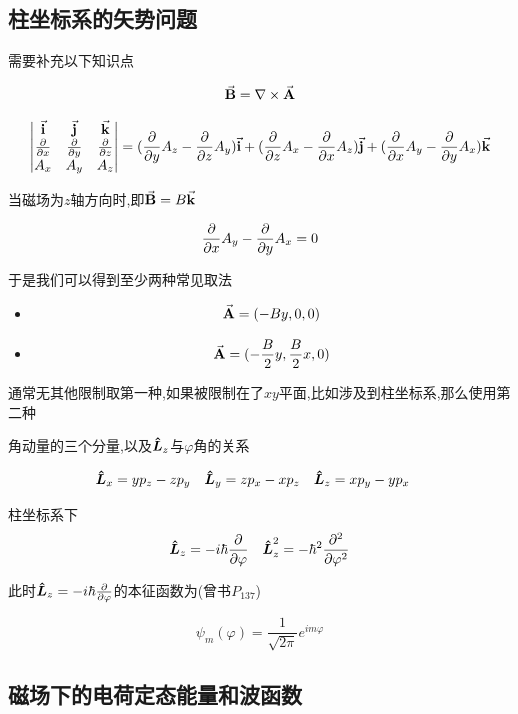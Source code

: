 \documentclass{article}
\begin{document}
        \subsection{柱坐标系的矢势问题}
            \begin{formal}
                需要补充以下知识点

                $$ \va{B} = \nabla \times \va{A} $$

                $$ 
                \mqty|\va{i} & \va{j} & \va{k} \\ \pdv{x} & \pdv{y} & \pdv{z} \\ A_{x} & A_{y} & A_{z}|  = 
                (\pdv{y}A_{z} - \pdv{z}A_{y}) \va{i} + (\pdv{z}A_{x} - \pdv{x}A_{z}) \va{j} + (\pdv{x}A_{y} - \pdv{y}A_{x})\va{k} 
                $$

                当磁场为$z$轴方向时,即$\va{B} = B \va{k}$

                $$ \pdv{x}A_{y} - \pdv{y}A_{x} = 0 $$

                于是我们可以得到至少两种常见取法
                \begin{itemize}
                    \item $$ \va{A} = (-By,0,0) $$
                    \item $$ \va{A} = (-\frac{B}{2}y,\frac{B}{2}x,0) $$
                \end{itemize}

                通常无其他限制取第一种,如果被限制在了$xy$平面,比如涉及到柱坐标系,那么使用第二种

                角动量的三个分量,以及$\vu*{L}_{z}$与$\varphi$角的关系

                $$ \vu*{L}_{x} = y p_{z} - z p_{y} \quad \vu*{L}_{y} = z p_{x} - x p_{z} \quad \vu*{L}_{z} = x p_{y} - y p_{x} \quad $$

                柱坐标系下
                $$ \vu*{L}_{z} = -i\hbar \pdv{\varphi} \quad \vu*{L}_{z}^{2} = -\hbar^{2} \pdv[2]{\varphi} $$

                此时$\vu*{L}_{z} = -i\hbar \pdv{\varphi}$的本征函数为(曾书$P_{137}$)

                $$ \psi_{m}(\varphi) = \frac{1}{\sqrt{2\pi}} e^{im\varphi} $$

            \end{formal}

        \subsection{磁场下的电荷定态能量和波函数}
\end{document}
